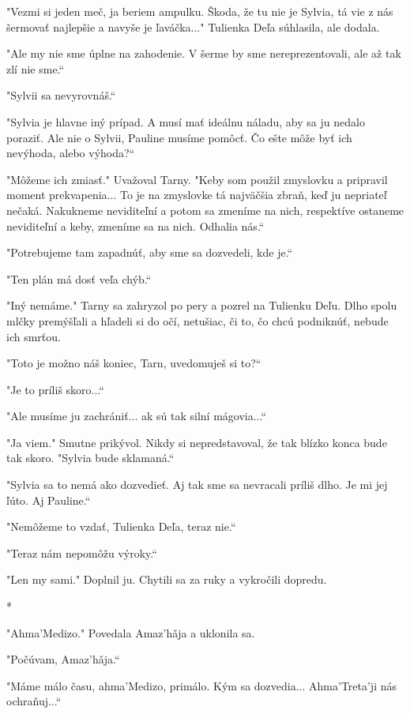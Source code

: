 \documentclass{book}
\begin{document}
"$ $Vezmi si jeden meč, ja beriem ampulku. Škoda, že tu nie je Sylvia, tá vie z nás šermovať najlepšie a navyše je ľaváčka..."$ $ Tulienka Deľa súhlasila, ale dodala.

"$ $Ale my nie sme úplne na zahodenie. V šerme by sme nereprezentovali, ale až tak zlí nie sme.“

"$ $Sylvii sa nevyrovnáš.“

"$ $Sylvia je hlavne iný prípad. A musí mať ideálnu náladu, aby sa ju nedalo poraziť. Ale nie o Sylvii, Pauline musíme pomôcť. Čo ešte môže byť ich nevýhoda, alebo výhoda?“

"$ $Môžeme ich zmiasť."$ $ Uvažoval Tarny. "$ $Keby som použil zmyslovku a pripravil moment prekvapenia... To je na zmyslovke tá najväčšia zbraň, keď ju nepriateľ nečaká. Nakukneme neviditeľní a potom sa zmeníme na nich, respektíve ostaneme neviditeľní a keby, zmeníme sa na nich. Odhalia nás.“

"$ $Potrebujeme tam zapadnúť, aby sme sa dozvedeli, kde je.“

"$ $Ten plán má dosť veľa chýb.“

"$ $Iný nemáme."$ $ Tarny sa zahryzol po pery a pozrel na Tulienku Deľu. Dlho spolu mlčky premýšľali a hľadeli si do očí, netušiac, či to, čo chcú podniknúť, nebude ich smrťou.

"$ $Toto je možno náš koniec, Tarn, uvedomuješ si to?“

"$ $Je to príliš skoro...“

"$ $Ale musíme ju zachrániť... ak sú tak silní mágovia...“

"$ $Ja viem."$ $ Smutne prikývol. Nikdy si nepredstavoval, že tak blízko konca bude tak skoro. "$ $Sylvia bude sklamaná.“

"$ $Sylvia sa to nemá ako dozvedieť. Aj tak sme sa nevracali príliš dlho. Je mi jej ľúto. Aj Pauline.“

"$ $Nemôžeme to vzdať, Tulienka Deľa, teraz nie.“

"$ $Teraz nám nepomôžu výroky.“

"$ $Len my sami."$ $ Doplnil ju. Chytili sa za ruky a vykročili dopredu.

\begin{center}
*
\end{center}

"$ $Ahma'Medizo."$ $ Povedala Amaz'ha\v{}ja a uklonila sa.

"$ $Počúvam, Amaz'ha\v{}ja.“

"$ $Máme málo času, ahma'Medizo, primálo. Kým sa dozvedia... Ahma'Treta'ji nás ochraňuj...“
\end{document}
